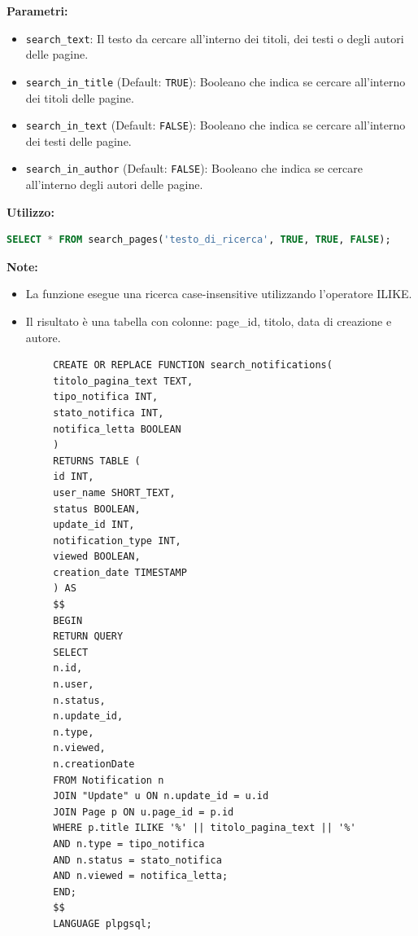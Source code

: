 \documentclass{article}
\begin{document}
	\textbf{Parametri:}\\	
	\begin{itemize}
		\item \texttt{search\_text}: Il testo da cercare all'interno dei titoli, dei testi o degli autori delle pagine.
		\item \texttt{search\_in\_title} (Default: \texttt{TRUE}): Booleano che indica se cercare all'interno dei titoli delle pagine.
		\item \texttt{search\_in\_text} (Default: \texttt{FALSE}): Booleano che indica se cercare all'interno dei testi delle pagine.
		\item \texttt{search\_in\_author} (Default: \texttt{FALSE}): Booleano che indica se cercare all'interno degli autori delle pagine.
	\end{itemize}
	
	\textbf{Utilizzo:}
	
	\begin{lstlisting}[language=SQL]
		SELECT * FROM search_pages('testo_di_ricerca', TRUE, TRUE, FALSE);
	\end{lstlisting}
	
	\textbf{Note:} \\
	
	\begin{itemize}
		\item La funzione esegue una ricerca case-insensitive utilizzando l'operatore ILIKE.
		\item Il risultato è una tabella con colonne: page\_id, titolo, data di creazione e autore.
	\end{itemize}
	
	
	\newpage
	
	
    \begin{lstlisting}
    	CREATE OR REPLACE FUNCTION search_notifications(
    	titolo_pagina_text TEXT,
    	tipo_notifica INT,
    	stato_notifica INT,
    	notifica_letta BOOLEAN
    	)
    	RETURNS TABLE (
    	id INT,
    	user_name SHORT_TEXT,
    	status BOOLEAN,
    	update_id INT,
    	notification_type INT,
    	viewed BOOLEAN,
    	creation_date TIMESTAMP
    	) AS
    	$$
    	BEGIN
    	RETURN QUERY
    	SELECT 
    	n.id,
    	n.user,
    	n.status,
    	n.update_id,
    	n.type,
    	n.viewed,
    	n.creationDate
    	FROM Notification n
    	JOIN "Update" u ON n.update_id = u.id
    	JOIN Page p ON u.page_id = p.id
    	WHERE p.title ILIKE '%' || titolo_pagina_text || '%'
    	AND n.type = tipo_notifica
    	AND n.status = stato_notifica
    	AND n.viewed = notifica_letta;
    	END;
    	$$
    	LANGUAGE plpgsql;
    \end{lstlisting}
    
\end{document}
